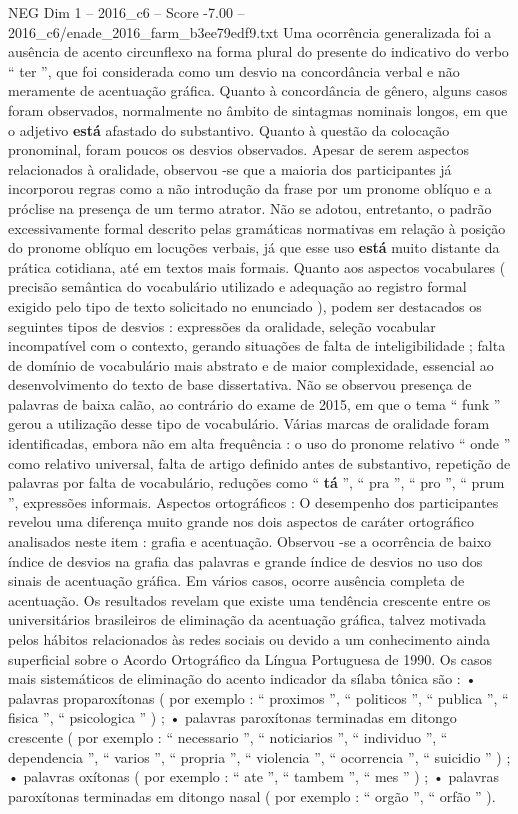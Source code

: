 \begin{textsample}{NEG Dim 1 – 2016\_c6 – Score -7.00 – 2016\_c6/enade\_2016\_farm\_b3ee79edf9.txt}
Uma ocorrência generalizada foi a ausência de acento circunflexo na forma plural do presente do indicativo do verbo “ ter ”, que foi considerada como um desvio na concordância verbal e não meramente de acentuação gráfica.
Quanto à concordância de gênero, alguns casos foram observados, normalmente no âmbito de sintagmas nominais longos, em que o adjetivo \textbf{está} afastado do substantivo.
Quanto à questão da colocação pronominal, foram poucos os desvios observados.
Apesar de serem aspectos relacionados à oralidade, observou -se que a maioria dos participantes já incorporou regras como a não introdução da frase por um pronome oblíquo e a próclise na presença de um termo atrator.
Não se adotou, entretanto, o padrão excessivamente formal descrito pelas gramáticas normativas em relação à posição do pronome oblíquo em locuções verbais, já que esse uso \textbf{está} muito distante da prática cotidiana, até em textos mais formais.
Quanto aos aspectos vocabulares ( precisão semântica do vocabulário utilizado e adequação ao registro formal exigido pelo tipo de texto solicitado no enunciado ), podem ser destacados os seguintes tipos de desvios : expressões da oralidade, seleção vocabular incompatível com o contexto, gerando situações de falta de inteligibilidade ; falta de domínio de vocabulário mais abstrato e de maior complexidade, essencial ao desenvolvimento do texto de base dissertativa.
Não se observou presença de palavras de baixa calão, ao contrário do exame de 2015, em que o tema “ funk ” gerou a utilização desse tipo de vocabulário.
Várias marcas de oralidade foram identificadas, embora não em alta frequência : o uso do pronome relativo “ onde ” como relativo universal, falta de artigo definido antes de substantivo, repetição de palavras por falta de vocabulário, reduções como “ \textbf{tá} ”, “ pra ”, “ pro ”, “ prum ”, expressões informais.
Aspectos ortográficos : O desempenho dos participantes revelou uma diferença muito grande nos dois aspectos de caráter ortográfico analisados neste item : grafia e acentuação.
Observou -se a ocorrência de baixo índice de desvios na grafia das palavras e grande índice de desvios no uso dos sinais de acentuação gráfica.
Em vários casos, ocorre ausência completa de acentuação.
Os resultados revelam que existe uma tendência crescente entre os universitários brasileiros de eliminação da acentuação gráfica, talvez motivada pelos hábitos relacionados às redes sociais ou devido a um conhecimento ainda superficial sobre o Acordo Ortográfico da Língua Portuguesa de 1990.
Os casos mais sistemáticos de eliminação do acento indicador da sílaba tônica são : • palavras proparoxítonas ( por exemplo : “ proximos ”, “ politicos ”, “ publica ”, “ fisica ”, “ psicologica ” ) ; • palavras paroxítonas terminadas em ditongo crescente ( por exemplo : “ necessario ”, “ noticiarios ”, “ individuo ”, “ dependencia ”, “ varios ”, “ propria ”, “ violencia ”, “ ocorrencia ”, “ suicidio ” ) ; • palavras oxítonas ( por exemplo : “ ate ”, “ tambem ”, “ mes ” ) ; • palavras paroxítonas terminadas em ditongo nasal ( por exemplo : “ orgão ”, “ orfão ” ).

\end{textsample}
